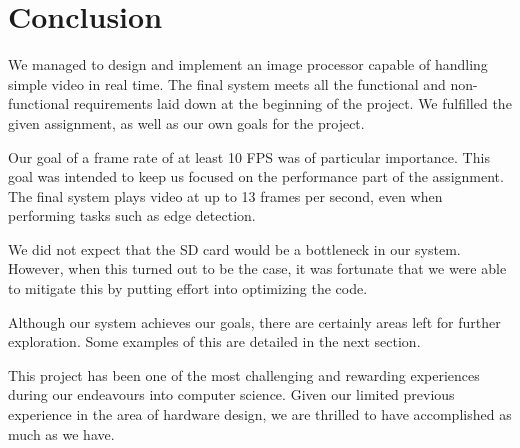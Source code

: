 \section{Conclusion}

We managed to design and implement an image processor capable of handling simple
video in real time. The final system meets all the functional and non-functional
requirements laid down at the beginning of the project. We fulfilled the given
assignment, as well as our own goals for the project.

Our goal of a frame rate of at least 10 FPS was of particular importance. This
goal was intended to keep us focused on the performance part of the
assignment. The final system plays video at up to 13 frames per second, even when
performing tasks such as edge detection.

We did not expect that the SD card would be a bottleneck in our system. However,
when this turned out to be the case, it was fortunate that we were able to
mitigate this by putting effort into optimizing the code.

Although our system achieves our goals, there are certainly areas left for
further exploration. Some examples of this are detailed in the next section.

This project has been one of the most challenging and rewarding experiences
during our endeavours into computer science. Given our limited previous
experience in the area of hardware design, we are thrilled to have accomplished
as much as we have.
